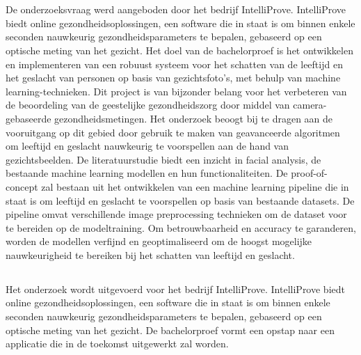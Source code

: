 
\chapter{}%
\label{ch:inleiding}

De onderzoeksvraag werd aangeboden door het bedrijf IntelliProve. IntelliProve biedt online gezondheidsoplossingen, een software die in staat is om binnen enkele seconden nauwkeurig gezondheidsparameters te bepalen, gebaseerd op een optische meting van het gezicht. Het doel van de bachelorproef is het ontwikkelen en implementeren van een robuust systeem voor het schatten van de leeftijd en het geslacht van personen op basis van gezichtsfoto’s, met behulp van machine learning-technieken. Dit project is van bijzonder belang voor het verbeteren van de beoordeling van de geestelijke gezondheidszorg door middel van camera-gebaseerde gezondheidsmetingen. Het onderzoek beoogt bij te dragen aan de vooruitgang op dit gebied door gebruik te maken van geavanceerde algoritmen om leeftijd en geslacht nauwkeurig te voorspellen aan de hand van gezichtsbeelden. De literatuurstudie biedt een inzicht in facial analysis, de bestaande machine learning modellen en hun functionaliteiten. De proof-of-concept zal bestaan uit het ontwikkelen van een machine learning pipeline die in staat is om leeftijd en geslacht te voorspellen op basis van bestaande datasets. De pipeline omvat verschillende image preprocessing technieken om de dataset voor te bereiden op de modeltraining. Om betrouwbaarheid en accuracy te garanderen, worden de modellen verfijnd en geoptimaliseerd om de hoogst mogelijke nauwkeurigheid te bereiken bij het schatten van leeftijd en geslacht.


\section{}%
\label{sec:probleemstelling}

Het onderzoek wordt uitgevoerd voor het bedrijf IntelliProve. IntelliProve biedt online gezondheidsoplossingen, een software die in staat is om binnen enkele seconden nauwkeurig gezondheidsparameters te bepalen, gebaseerd op een optische meting van het gezicht. De bachelorproef vormt een opstap naar een applicatie die in de toekomst uitgewerkt zal worden. 

